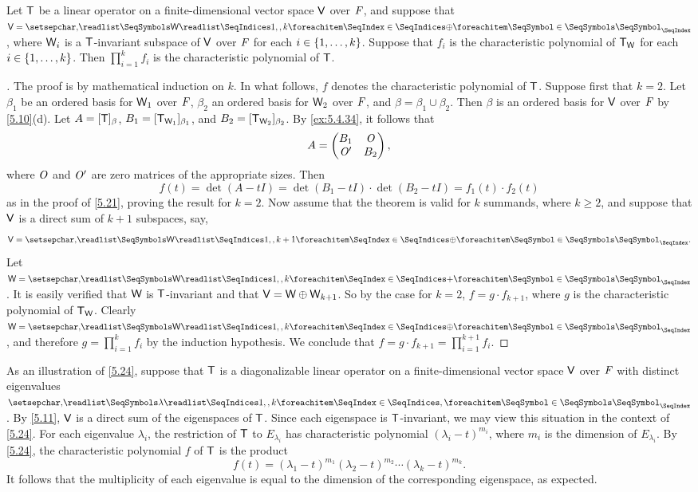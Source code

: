 \begin{thm}\label{5.24}
	Let \(\mathsf{T}\) be a linear operator on a finite-dimensional vector space \(\mathsf{V}\) over \(\mathit{F}\), and suppose that \(\V = \seq[\oplus]{\W}{1,,k}\), where \(\mathsf{W}_i\) is a \(\mathsf{T}\)-invariant subspace of \(\mathsf{V}\) over \(\mathit{F}\) for each \(i \in \left\lbrace1, \dots, k\right\rbrace\).
	Suppose that \(f_i\) is the characteristic polynomial of \(\mathsf{T}_{\mathsf{W}}\) for each \(i \in \left\lbrace1, \dots, k\right\rbrace\).
	Then \(\prod_{i = 1}^k f_i\) is the characteristic polynomial of \(\mathsf{T}\).
\end{thm}

\begin{proof}[]
	The proof is by mathematical induction on \(k\).
	In what follows, \(f\) denotes the characteristic polynomial of \(\mathsf{T}\).
	Suppose first that \(k = 2\).
	Let \(\beta_1\) be an ordered basis for \(\mathsf{W}_1\) over \(\mathit{F}\), \(\beta_2\) an ordered basis for \(\mathsf{W}_2\) over \(\mathit{F}\), and \(\beta = \beta_1 \cup \beta_2\).
	Then \(\beta\) is an ordered basis for \(\mathsf{V}\) over \(\mathit{F}\) by \cref{5.10}(d).
	Let \(A = [\mathsf{T}]_{\beta}\), \(B_1 = [\mathsf{T}_{\mathsf{W}_1}]_{\beta_1}\), and \(B_2 = [\mathsf{T}_{\mathsf{W}_2}]_{\beta_2}\).
	By \cref{ex:5.4.34}, it follows that
	\[
		A = \begin{pmatrix}
			B_1  & \mathit{O} \\
			\mathit{O}' & B_2
		\end{pmatrix},
	\]
	where \(\mathit{O}\) and \(\mathit{O}'\) are zero matrices of the appropriate sizes.
	Then
	\[
		f(t) = \det(A - tI) = \det(B_1 - tI) \cdot \det(B_2 - tI) = f_1(t) \cdot f_2(t)
	\]
	as in the proof of \cref{5.21}, proving the result for \(k = 2\).
	Now assume that the theorem is valid for \(k\) summands, where \(k \geq 2\), and suppose that \(\mathsf{V}\) is a direct sum of \(k + 1\) subspaces, say,
	\[
		\V = \seq[\oplus]{\W}{1,,k+1}.
	\]
	Let \(\W = \seq[+]{\W}{1,,k}\).
	It is easily verified that \(\mathsf{W}\) is \(\mathsf{T}\)-invariant and that \(\mathsf{V} = \mathsf{W} \oplus \mathsf{W}_{k + 1}\).
	So by the case for \(k = 2\), \(f = g \cdot f_{k + 1}\), where \(g\) is the characteristic polynomial of \(\mathsf{T}_{\mathsf{W}}\).
	Clearly \(\W = \seq[\oplus]{\W}{1,,k}\), and therefore \(g = \prod_{i = 1}^k f_i\) by the induction hypothesis.
	We conclude that \(f = g \cdot f_{k + 1} = \prod_{i = 1}^{k + 1} f_i\).
\end{proof}

\begin{note}
	As an illustration of \cref{5.24}, suppose that \(\mathsf{T}\) is a diagonalizable linear operator on a finite-dimensional vector space \(\mathsf{V}\) over \(\mathit{F}\) with distinct eigenvalues \(\seq{\lambda}{1,,k}\).
	By \cref{5.11}, \(\mathsf{V}\) is a direct sum of the eigenspaces of \(\mathsf{T}\).
	Since each eigenspace is \(\mathsf{T}\)-invariant, we may view this situation in the context of \cref{5.24}.
	For each eigenvalue \(\lambda_i\), the restriction of \(\mathsf{T}\) to \(E_{\lambda_i}\) has characteristic polynomial \((\lambda_i - t)^{m_i}\), where \(m_i\) is the dimension of \(E_{\lambda_i}\).
	By \cref{5.24}, the characteristic polynomial \(f\) of \(\mathsf{T}\) is the product
	\[
		f(t) = (\lambda_1 - t)^{m_1} (\lambda_2 - t)^{m_2} \cdots (\lambda_k - t)^{m_k}.
	\]
	It follows that the multiplicity of each eigenvalue is equal to the dimension of the corresponding eigenspace, as expected.
\end{note}

